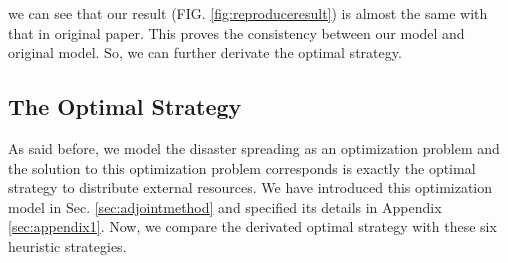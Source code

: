 %
we can see that our result (FIG. \ref{fig:reproduceresult}) is almost the same with that in original paper\cite{buzna2007efficient}. This proves the consistency between our model and original model. So, we can further derivate the optimal strategy.

\subsection{The Optimal Strategy}
As said before, we model the disaster spreading as an optimization problem and the solution to this optimization problem corresponds is exactly the optimal strategy to distribute external resources. We have introduced this optimization model in Sec. \ref{sec:adjointmethod} and specified its details in Appendix \ref{sec:appendix1}. Now, we compare the derivated optimal strategy with these six heuristic strategies.


